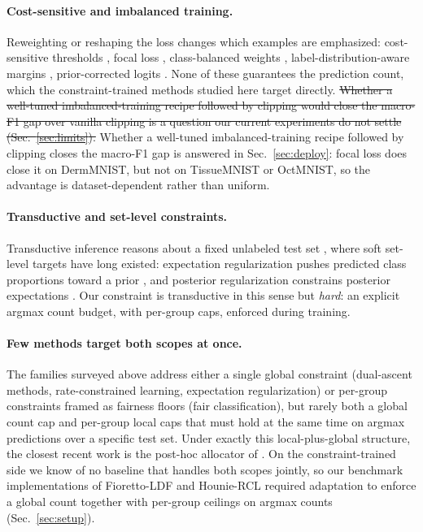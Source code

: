 \documentclass[10pt]{article}
\newcommand{\del}[1]{{\color{red}\sout{#1}}}
\begin{document}
\paragraph{Cost-sensitive and imbalanced training.}
Reweighting or reshaping the loss changes which examples are emphasized:
cost-sensitive thresholds \citep{elkan2001foundations}, focal loss
\citep{lin2017focal}, class-balanced weights \citep{cui2019class},
label-distribution-aware margins \citep{cao2019learning}, prior-corrected
logits \citep{menon2020long}. None of these guarantees the prediction count, which the
constraint-trained methods studied here target directly. \del{Whether a
well-tuned imbalanced-training recipe followed by clipping would close
the macro-F1 gap over vanilla clipping is a question our current
experiments do not settle \mbox{(Sec.~\ref{sec:limits})}.}
{\color{blue}Whether a well-tuned imbalanced-training recipe followed by
clipping closes the macro-F1 gap is answered in Sec.~\ref{sec:deploy}: focal
loss does close it on DermMNIST, but not on TissueMNIST or OctMNIST, so the
advantage is dataset-dependent rather than uniform.}

\paragraph{Transductive and set-level constraints.}
Transductive inference reasons about a fixed unlabeled test set
\citep{vapnik1998statistical,joachims1999transductive}, where soft set-level
targets have long existed: expectation regularization pushes predicted class
proportions toward a prior \citep{mann2007simple}, and posterior
regularization constrains posterior expectations \citep{ganchev2009posterior}.
Our constraint is transductive in this sense but \emph{hard}: an explicit
argmax count budget, with per-group caps, enforced during training.

\paragraph{Few methods target both scopes at once.}
The families surveyed above address either a single global constraint
(dual-ascent methods, rate-constrained learning, expectation
regularization) or per-group constraints framed as fairness floors (fair
classification), but rarely both a global count cap and per-group local
caps that must hold at the same time on argmax predictions over a
specific test set. Under exactly this local-plus-global structure, the
closest recent work is the post-hoc allocator of
\citet{shifman2025classification}. On the constraint-trained side we
know of no baseline that handles both scopes jointly, so our benchmark
implementations of Fioretto-LDF and Hounie-RCL required adaptation to
enforce a global count together with per-group ceilings on argmax
counts (Sec.~\ref{sec:setup}).
\end{document}
